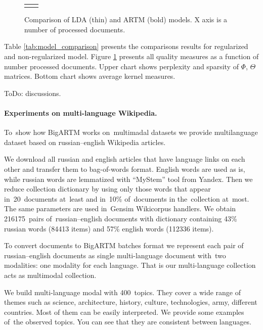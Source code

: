 \documentclass[russian]{llncs}
\begin{document}
\begin{figure}[h!]
\begin{tabular}{cc}

&

\end{tabular}
\caption{Comparison of LDA (thin) and ARTM (bold) models. X axis is a number of processed documents.}
\label{fig:comparison_plot}
\end{figure}

Table \ref{tab:model_comparison} presents the comparisons results for regularized and non-regularized model.
Figure \ref{fig:comparison_plot} presents all quality measures as a function of number processed documents.
Upper chart shows perplexity and sparsity of $\Phi$, $\Theta$ matrices.
Bottom chart shows average kernel measures.

{\color{red}ToDo: discussions.}

\paragraph{Experiments on multi-language Wikipedia.}

To~show how BigARTM works on~multimadal datasets we provide multilanguage dataset
based on russian--english Wikipedia articles.

We download all russian and english articles that have language links on each other
and transfer them to bag-of-words format.
English words are used as is, while russian words are lemmatized with ``MyStem'' tool from Yandex.
Then we reduce collection dictionary by using only those words
that appear in~20~documents at~least and in~10\% of~documents in the~collection at~most.
The same parameters are used in~Gensim Wikicorpus handlers.
We obtain 216175~pairs of~russian--english documents with dictionary
containing 43\% russian words (84413 items) and 57\% english words (112336 items).

To convert documents to BigARTM batches format we represent each pair of russian--english documents
as single multi-language document with~two modalities: one modality for each language.
That is our multi-language collection acts as multimodal collection.

We build multi-language modal with 400~topics. They cover a wide range of themes such as science, architecture, history, culture, technologies, army, different countries.
Most of them can be easily interpreted.
We provide some examples of~the observed topics.
You can see that they are consistent between languages.
\end{document}
